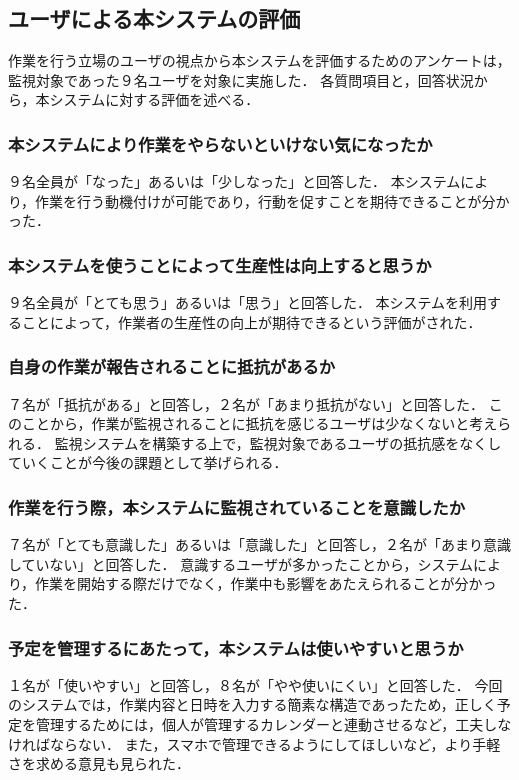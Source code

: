 \subsection{ユーザによる本システムの評価}
作業を行う立場のユーザの視点から本システムを評価するためのアンケートは，監視対象であった９名ユーザを対象に実施した．
各質問項目と，回答状況から，本システムに対する評価を述べる．

\subsubsection{本システムにより作業をやらないといけない気になったか}
９名全員が「なった」あるいは「少しなった」と回答した．
本システムにより，作業を行う動機付けが可能であり，行動を促すことを期待できることが分かった．

\subsubsection{本システムを使うことによって生産性は向上すると思うか}
９名全員が「とても思う」あるいは「思う」と回答した．
本システムを利用することによって，作業者の生産性の向上が期待できるという評価がされた．

\subsubsection{自身の作業が報告されることに抵抗があるか}
７名が「抵抗がある」と回答し，２名が「あまり抵抗がない」と回答した．
このことから，作業が監視されることに抵抗を感じるユーザは少なくないと考えられる．
監視システムを構築する上で，監視対象であるユーザの抵抗感をなくしていくことが今後の課題として挙げられる．

\subsubsection{作業を行う際，本システムに監視されていることを意識したか}
７名が「とても意識した」あるいは「意識した」と回答し，２名が「あまり意識していない」と回答した．
意識するユーザが多かったことから，システムにより，作業を開始する際だけでなく，作業中も影響をあたえられることが分かった．

\subsubsection{予定を管理するにあたって，本システムは使いやすいと思うか}
１名が「使いやすい」と回答し，８名が「やや使いにくい」と回答した．
今回のシステムでは，作業内容と日時を入力する簡素な構造であったため，正しく予定を管理するためには，個人が管理するカレンダーと連動させるなど，工夫しなければならない．
また，スマホで管理できるようにしてほしいなど，より手軽さを求める意見も見られた．

